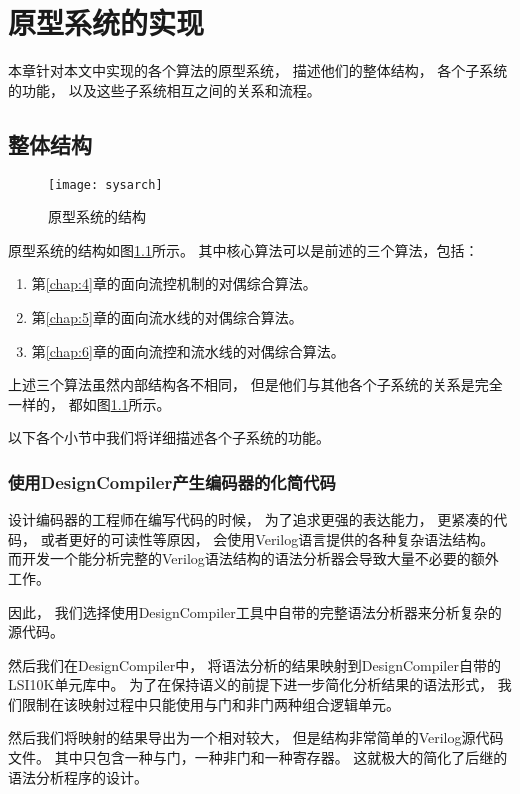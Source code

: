 \chapter{原型系统的实现}
\label{chap:7}
本章针对本文中实现的各个算法的原型系统，
描述他们的整体结构，
各个子系统的功能，
以及这些子系统相互之间的关系和流程。

\section{整体结构}



\begin{figure}[t]
\centering
\texttt{[image: sysarch]}
\caption{原型系统的结构}
\label{fig_sysarch}
\end{figure}

原型系统的结构如图\ref{fig_sysarch}所示。
其中核心算法可以是前述的三个算法，包括：
\begin{enumerate}
\item 第\ref{chap:4}章的面向流控机制的对偶综合算法。
\item 第\ref{chap:5}章的面向流水线的对偶综合算法。
\item 第\ref{chap:6}章的面向流控和流水线的对偶综合算法。
\end{enumerate}


上述三个算法虽然内部结构各不相同，
但是他们与其他各个子系统的关系是完全一样的，
都如图\ref{fig_sysarch}所示。

以下各个小节中我们将详细描述各个子系统的功能。

\subsection{使用DesignCompiler产生编码器的化简代码}

设计编码器的工程师在编写代码的时候，
为了追求更强的表达能力，
更紧凑的代码，
或者更好的可读性等原因，
会使用Verilog语言提供的各种复杂语法结构。
而开发一个能分析完整的Verilog语法结构的语法分析器会导致大量不必要的额外工作。

因此，
我们选择使用DesignCompiler工具中自带的完整语法分析器来分析复杂的源代码。

然后我们在DesignCompiler中，
将语法分析的结果映射到DesignCompiler自带的LSI10K单元库中。
为了在保持语义的前提下进一步简化分析结果的语法形式，
我们限制在该映射过程中只能使用与门和非门两种组合逻辑单元。

然后我们将映射的结果导出为一个相对较大，
但是结构非常简单的Verilog源代码文件。
其中只包含一种与门，一种非门和一种寄存器。
这就极大的简化了后继的语法分析程序的设计。



